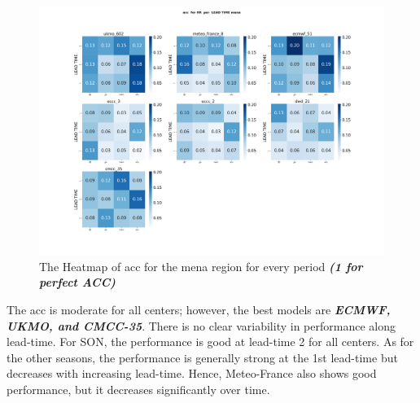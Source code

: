 \begin{figure}[H]
	\centering
	\includegraphics[scale=0.25]{plots/det/acc/acc_RR_mena.png}
	\caption{The Heatmap of acc for the mena region for every period \textbf{\textit{(1 for perfect ACC)} }}
\end{figure}
The acc is moderate for all centers; however, the best models are \textbf{\textit{ECMWF, UKMO, and CMCC-35}}. There is no clear variability in performance along lead-time. For SON, the performance is good at lead-time 2 for all centers. As for the other seasons, the performance is generally strong at the 1st lead-time but decreases with increasing lead-time.
Hence, Meteo-France also shows good performance, but it decreases significantly over time.



